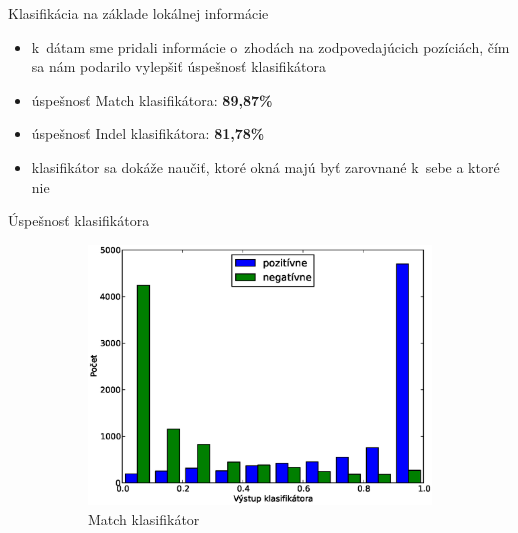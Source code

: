 \documentclass[xcolor=dvipsnames, compress, 12pt]{beamer}
\theoremstyle{definition}
\begin{document}
\begin{frame}{Klasifikácia na základe lokálnej informácie}
  \begin{itemize}
    \item k~dátam sme pridali informácie o~zhodách na zodpovedajúcich pozíciách, čím sa nám podarilo vylepšiť úspešnosť klasifikátora
    \item úspešnosť Match klasifikátora: \textbf{89,87\%}
    \item úspešnosť Indel klasifikátora: \textbf{81,78\%}
    \item klasifikátor sa dokáže naučiť, ktoré okná majú byť zarovnané k~sebe a ktoré nie
\end{itemize}
\end{frame}


\begin{frame}{Úspešnosť klasifikátora}
\begin{figure}[h]
        \centering
        \begin{subfigure}[b]{0.45\textwidth}
               \includegraphics[width=\textwidth]{images/randomforest_combined_5_test}
                \caption{Match klasifikátor}
        \end{subfigure}%
        \qquad %
        \begin{subfigure}[b]{0.45\textwidth}

\end{subfigure}
\end{figure}
\end{frame}
\end{document}
